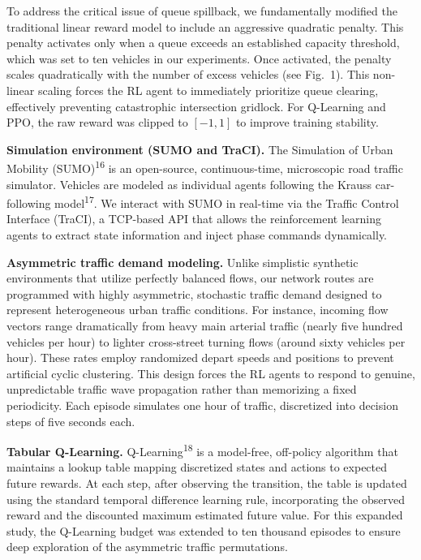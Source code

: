 \documentclass[10pt,a4paper]{article}
\begin{document}
To address the critical issue of queue spillback, we fundamentally modified the traditional linear reward model to include an aggressive quadratic penalty. This penalty activates only when a queue exceeds an established capacity threshold, which was set to ten vehicles in our experiments. Once activated, the penalty scales quadratically with the number of excess vehicles (see Fig.~1). This non-linear scaling forces the RL agent to immediately prioritize queue clearing, effectively preventing catastrophic intersection gridlock. For Q-Learning and PPO, the raw reward was clipped to $[-1, 1]$ to improve training stability.

\textbf{Simulation environment (SUMO and TraCI).}
The Simulation of Urban Mobility (SUMO)\textsuperscript{16} is an open-source, continuous-time, microscopic road traffic simulator. Vehicles are modeled as individual agents following the Krauss car-following model\textsuperscript{17}. We interact with SUMO in real-time via the Traffic Control Interface (TraCI), a TCP-based API that allows the reinforcement learning agents to extract state information and inject phase commands dynamically.

\textbf{Asymmetric traffic demand modeling.}
Unlike simplistic synthetic environments that utilize perfectly balanced flows, our network routes are programmed with highly asymmetric, stochastic traffic demand designed to represent heterogeneous urban traffic conditions. For instance, incoming flow vectors range dramatically from heavy main arterial traffic (nearly five hundred vehicles per hour) to lighter cross-street turning flows (around sixty vehicles per hour). These rates employ randomized depart speeds and positions to prevent artificial cyclic clustering. This design forces the RL agents to respond to genuine, unpredictable traffic wave propagation rather than memorizing a fixed periodicity. Each episode simulates one hour of traffic, discretized into decision steps of five seconds each.

\textbf{Tabular Q-Learning.}
Q-Learning\textsuperscript{18} is a model-free, off-policy algorithm that maintains a lookup table mapping discretized states and actions to expected future rewards. At each step, after observing the transition, the table is updated using the standard temporal difference learning rule, incorporating the observed reward and the discounted maximum estimated future value. For this expanded study, the Q-Learning budget was extended to ten thousand episodes to ensure deep exploration of the asymmetric traffic permutations.
\end{document}

